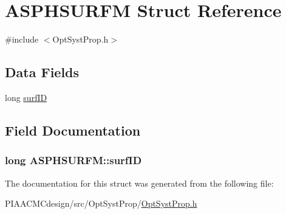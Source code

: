 \hypertarget{structASPHSURFM}{\section{A\+S\+P\+H\+S\+U\+R\+F\+M Struct Reference}
\label{structASPHSURFM}
}


{\ttfamily \#include $<$Opt\+Syst\+Prop.\+h$>$}

\subsection*{Data Fields}
\begin{DoxyCompactItemize}
\item 
long \hyperlink{structASPHSURFM_a1f7121b76f3219786afaaff57b3e6a8a}{surf\+I\+D}
\end{DoxyCompactItemize}


\subsection{Field Documentation}
\hypertarget{structASPHSURFM_a1f7121b76f3219786afaaff57b3e6a8a}{
\subsubsection[{surf\+I\+D}]{\setlength{\rightskip}{0pt plus 5cm}long A\+S\+P\+H\+S\+U\+R\+F\+M\+::surf\+I\+D}}\label{structASPHSURFM_a1f7121b76f3219786afaaff57b3e6a8a}


The documentation for this struct was generated from the following file\+:\begin{DoxyCompactItemize}
\item 
P\+I\+A\+A\+C\+M\+Cdesign/src/\+Opt\+Syst\+Prop/\hyperlink{PIAACMCdesign_2src_2OptSystProp_2OptSystProp_8h}{Opt\+Syst\+Prop.\+h}\end{DoxyCompactItemize}
